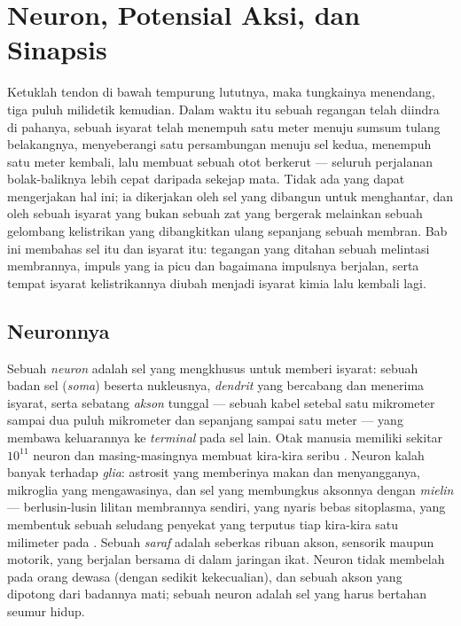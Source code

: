\chapter{Neuron, Potensial Aksi, dan Sinapsis}\label{ch:b2:neurons-synapses}

Ketuklah tendon di bawah tempurung lututnya, maka tungkainya
menendang, tiga puluh milidetik kemudian. Dalam waktu itu sebuah
regangan telah diindra di pahanya, sebuah isyarat telah menempuh satu
meter menuju sumsum tulang belakangnya, menyeberangi satu persambungan
menuju sel kedua, menempuh satu meter kembali, lalu membuat sebuah otot
berkerut --- seluruh perjalanan bolak-baliknya lebih cepat daripada
sekejap mata. Tidak ada  yang dapat mengerjakan hal ini; ia
dikerjakan oleh sel yang dibangun untuk menghantar, dan oleh sebuah
isyarat yang bukan sebuah zat yang bergerak melainkan sebuah gelombang
kelistrikan yang dibangkitkan ulang sepanjang sebuah membran. Bab ini
membahas sel itu dan isyarat itu: tegangan yang ditahan sebuah 
melintasi membrannya, impuls yang ia picu dan bagaimana impulsnya
berjalan, serta  tempat isyarat kelistrikannya diubah menjadi
isyarat kimia lalu kembali lagi.

\section{Neuronnya}

\begin{definition}\label{def:b2:neurons-synapses:neuron}
Sebuah \emph{neuron} adalah sel yang mengkhusus untuk memberi isyarat:
sebuah badan sel (\emph{soma}) beserta nukleusnya, \emph{dendrit} yang
bercabang dan menerima isyarat, serta sebatang \emph{akson} tunggal ---
sebuah kabel setebal satu mikrometer sampai dua puluh mikrometer dan
sepanjang sampai satu meter --- yang membawa keluarannya ke
\emph{terminal} pada sel lain. Otak manusia memiliki sekitar $10^{11}$
neuron dan masing-masingnya membuat kira-kira seribu . Neuron
kalah banyak terhadap \emph{glia}: astrosit yang memberinya makan dan
menyangganya, mikroglia yang mengawasinya, dan sel yang membungkus
aksonnya dengan \emph{mielin} --- berlusin-lusin lilitan membrannya
sendiri, yang nyaris bebas sitoplasma, yang membentuk sebuah seludang
penyekat yang terputus tiap kira-kira satu milimeter pada \emph{}. Sebuah \emph{saraf} adalah seberkas ribuan akson, sensorik
maupun motorik, yang berjalan bersama di dalam jaringan ikat. Neuron
tidak membelah pada orang dewasa (dengan sedikit kekecualian), dan
sebuah akson yang dipotong dari badannya mati; sebuah neuron adalah sel
yang harus bertahan seumur hidup.
\end{definition}

